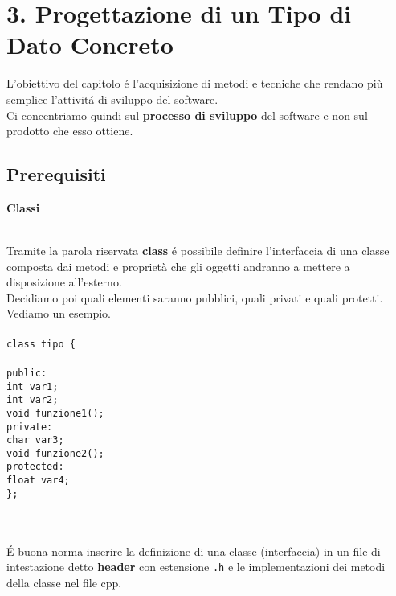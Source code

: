 \documentclass{article}
\newcommand\tab[1][1cm]{\hspace*{#1}}
\begin{document}
\section*{\textcolor{blu}{3. Progettazione di un Tipo di Dato Concreto}} 
L'obiettivo del capitolo \'e l'acquisizione di metodi e tecniche che rendano più semplice l'attivit\'a di sviluppo del software.\\ Ci concentriamo quindi sul \textbf{processo di sviluppo} del software e non sul prodotto che esso ottiene.
\textcolor{grigio}{\section*{Prerequisiti \\ }} 
\textcolor{grigio}{\begin{large}\textbf{Classi}\\ \end{large}
\\Tramite la parola riservata \textbf{class} \'e possibile definire l'interfaccia di una classe composta dai metodi e proprietà che gli oggetti andranno a mettere a disposizione all'esterno. \\Decidiamo poi quali elementi saranno pubblici, quali privati e quali protetti.\\ Vediamo un esempio.\\ \\ \tt{class tipo \{ \\ \\ \tab public: \\ \tab \tab int var1; \\ \tab \tab int var2; \\ \tab \tab void funzione1(); \\ \tab private: \\ \tab \tab char var3; \\ \tab \tab void funzione2(); \\ \tab protected: \\ \tab \tab float var4; \\ \};}}
\\ \\ 
\textcolor{grigio}{\'E buona norma inserire la definizione di una classe (interfaccia) in un file di intestazione detto \textbf{header} con estensione \texttt{.h} e le implementazioni dei metodi della classe nel file cpp.}
\\ \\ \\ \\ \\
\end{document}
